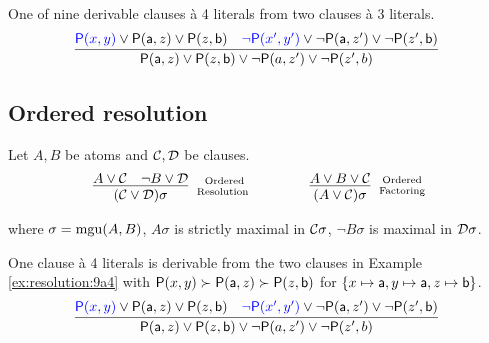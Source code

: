 \begin{example}\label{ex:resolution:9a4}
	One of {\myem nine} derivable clauses à 4 literals from two clauses à 3 literals.
	\begin{gather*}
	\infer[]{\mP(\ma,z)\lor\mP(z,\mb)\lor\lnot\mP(a,z')\lor\lnot\mP(z',b)}
	{{\colN\mP(x,y)}\lor\mP(\ma,z)\lor\mP(z,\mb) & {\colN\lnot\mP(x',y')}\lor\lnot\mP(\ma,z')\lor\lnot\mP(z',\mb)}
	\end{gather*}
\end{example}

\subsection{Ordered resolution}\label{sec:ordered:resolution}

\begin{definition}\label{def:ordered:resolution}
	Let \(A, B\) be atoms and \(\mathcal{C},\mathcal{D}\) be clauses.
	\begin{gather*}
	\infer
	[\text{Ordered}\atop\text{Resolution	}]
	{(\mcC\lor\mcD)\sigma}
	{A\lor\mcC&\lnot B\lor\mcD}
	\qquad\qquad
	\infer
	[\text{Ordered}\atop\text{Factoring}]
	{(A\lor\mcC)\sigma}
	{A\lor B\lor\mcC}
	\end{gather*}
	\begin{center}
		where \(\sigma=\operatorname{mgu}(A,B)\),
		\(A\sigma\) is strictly maximal in \(\mathcal{C}\sigma\),
		\(\lnot B\sigma\) is maximal in \(\mathcal{D}\sigma\).
	\end{center}
\end{definition}

\begin{example}\label{ex:resolution:1a4}
	One clause à 4 literals is derivable from the two clauses
	in Example \vref{ex:resolution:9a4} with \(\mathsf{P}(x,y)\succ\mathsf{P}(\mathsf{a},z)\succ\mathsf{P}(z,\mathsf{b})\)
	for \(\{x\mapsto\mathsf{a}, y\mapsto\mathsf{a},z\mapsto\mathsf{b}\}\).
	\begin{gather*}
	\infer[]{\mP(\ma,z)\lor\mP(z,\mb)\lor\lnot\mP(a,z')\lor\lnot\mP(z',b)}
	{{\colN\mP(x,y)}\lor\mP(\ma,z)\lor\mP(z,\mb) & {\colN\lnot\mP(x',y')}\lor\lnot\mP(\ma,z')\lor\lnot\mP(z',\mb)}
	\end{gather*}

\end{example}

